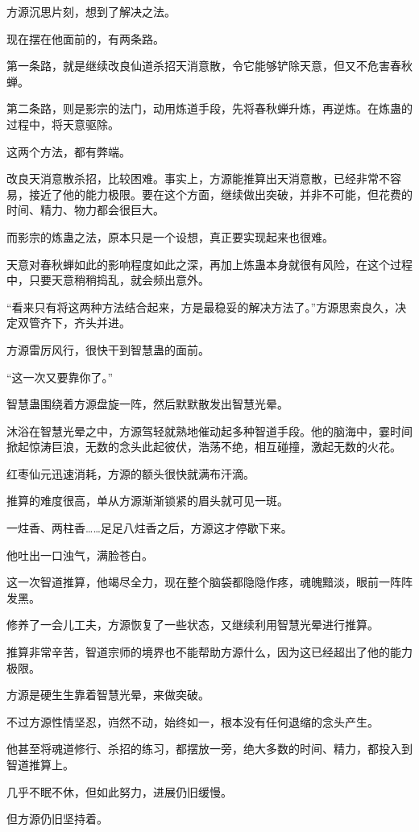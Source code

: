 \begin{this_body}
方源沉思片刻，想到了解决之法。

现在摆在他面前的，有两条路。

第一条路，就是继续改良仙道杀招天消意散，令它能够铲除天意，但又不危害春秋蝉。

第二条路，则是影宗的法门，动用炼道手段，先将春秋蝉升炼，再逆炼。在炼蛊的过程中，将天意驱除。

这两个方法，都有弊端。

改良天消意散杀招，比较困难。事实上，方源能推算出天消意散，已经非常不容易，接近了他的能力极限。要在这个方面，继续做出突破，并非不可能，但花费的时间、精力、物力都会很巨大。

而影宗的炼蛊之法，原本只是一个设想，真正要实现起来也很难。

天意对春秋蝉如此的影响程度如此之深，再加上炼蛊本身就很有风险，在这个过程中，只要天意稍稍捣乱，就会频出意外。

“看来只有将这两种方法结合起来，方是最稳妥的解决方法了。”方源思索良久，决定双管齐下，齐头并进。

方源雷厉风行，很快干到智慧蛊的面前。

“这一次又要靠你了。”

智慧蛊围绕着方源盘旋一阵，然后默默散发出智慧光晕。

沐浴在智慧光晕之中，方源驾轻就熟地催动起多种智道手段。他的脑海中，霎时间掀起惊涛巨浪，无数的念头此起彼伏，浩荡不绝，相互碰撞，激起无数的火花。

红枣仙元迅速消耗，方源的额头很快就满布汗滴。

推算的难度很高，单从方源渐渐锁紧的眉头就可见一斑。

一炷香、两柱香……足足八炷香之后，方源这才停歇下来。

他吐出一口浊气，满脸苍白。

这一次智道推算，他竭尽全力，现在整个脑袋都隐隐作疼，魂魄黯淡，眼前一阵阵发黑。

修养了一会儿工夫，方源恢复了一些状态，又继续利用智慧光晕进行推算。

推算非常辛苦，智道宗师的境界也不能帮助方源什么，因为这已经超出了他的能力极限。

方源是硬生生靠着智慧光晕，来做突破。

不过方源性情坚忍，岿然不动，始终如一，根本没有任何退缩的念头产生。

他甚至将魂道修行、杀招的练习，都摆放一旁，绝大多数的时间、精力，都投入到智道推算上。

几乎不眠不休，但如此努力，进展仍旧缓慢。

但方源仍旧坚持着。


\end{this_body}
